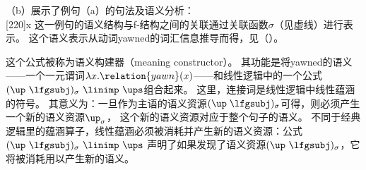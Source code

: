 （b）展示了例句（a）的句法及语义分析：
\eal
{}
\ex ~\\[-\baselineskip]
\hspace*{-2em}
{}%
\hspace*{3em}%
{}%
\hspace*{2em}%
\Aput*{$\phi$}
[220]{x}
\Bput*{$\sigma$}
\zl
% 
这一例句的语义结构与f-结构之间的关联通过关联函数$\sigma$（见虚线）进行表示。
这个语义表示从动词yawned的词汇信息推导而得，见（）。

\ea
{}
\z

\noindent 
这个公式被称为语义构建器（meaning constructor）。
其功能是将yawned的语义——一个一元谓词$\lambda x. \relation{yawn}(x)$——和线性逻辑中的一个公式\is{\linimp}
\mbox{$(\up\ \lfgsubj)_\sigma\ \linimp\ \ups$}组合起来。
这里，连接词\linimp 是线性逻辑中线性蕴涵的符号。
其意义为：一旦作为主语的语义资源$(\up\;\lfgsubj)_\sigma$可得，则必须产生一个新的语义资源$\up_\sigma$，
这个新的语义资源对应于整个句子的语义。 
不同于经典逻辑里的蕴涵算子，线性蕴涵必须被消耗并产生新的语义资源：公式\mbox{$(\up\ \lfgsubj)_\sigma\ \linimp\ \ups$}
声明了如果发现了语义资源\mbox{$(\up\  \lfgsubj)_\sigma$}，它将被消耗用以产生新的语义\ups。

